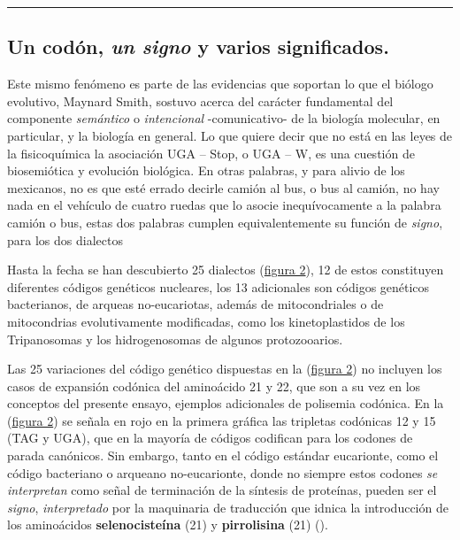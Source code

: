 \documentclass[
  12pt, krantz2,
  spanish,
]{krantz}
\begin{document}
\begin{center}\rule{0.5\linewidth}{0.5pt}\end{center}

\hypertarget{un-coduxf3n-un-signo-y-varios-significados.}{%
\subsection{\texorpdfstring{Un codón, \emph{un signo} y varios significados.}{Un codón, un signo y varios significados.}}\label{un-coduxf3n-un-signo-y-varios-significados.}}

Este mismo fenómeno es parte de las evidencias que soportan lo que el biólogo evolutivo, Maynard Smith, sostuvo acerca del carácter fundamental del componente \emph{semántico} o \emph{intencional} -comunicativo- de la biología molecular, en particular, y la biología en general. Lo que quiere decir que no está en las leyes de la fisicoquímica la asociación UGA -- Stop, o UGA -- W, es una cuestión de biosemiótica y evolución biológica. En otras palabras, y para alivio de los mexicanos, no es que esté errado decirle camión al bus, o bus al camión, no hay nada en el vehículo de cuatro ruedas que lo asocie inequívocamente a la palabra camión o bus, estas dos palabras cumplen equivalentemente su función de \emph{signo}, para los dos dialectos

Hasta la fecha se han descubierto 25 dialectos (\protect\hyperlink{variaciones1}{figura 2}), 12 de estos constituyen diferentes códigos genéticos nucleares, los 13 adicionales son códigos genéticos bacterianos, de arqueas no-eucariotas, además de mitocondriales o de mitocondrias evolutivamente modificadas, como los kinetoplastidos de los Tripanosomas y los hidrogenosomas de algunos protozooarios.

Las 25 variaciones del código genético dispuestas en la (\protect\hyperlink{variaciones1}{figura 2}) no incluyen los casos de expansión codónica del aminoácido 21 y 22, que son a su vez en los conceptos del presente ensayo, ejemplos adicionales de polisemia codónica. En la (\protect\hyperlink{variaciones1}{figura 2}) se señala en rojo en la primera gráfica las tripletas codónicas 12 y 15 (TAG y UGA), que en la mayoría de códigos codifican para los codones de parada canónicos. Sin embargo, tanto en el código estándar eucarionte, como el código bacteriano o arqueano no-eucarionte, donde no siempre estos codones \emph{se interpretan} como señal de terminación de la síntesis de proteínas, pueden ser el \emph{signo}, \emph{interpretado} por la maquinaria de traducción que idnica la introducción de los aminoácidos \textbf{selenocisteína} (21) y \textbf{pirrolisina} (21) (\citet{ling2015genetic}).
\end{document}
